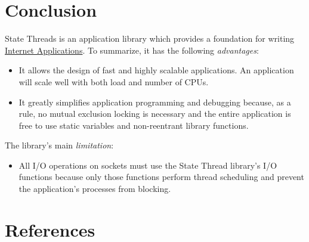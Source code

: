 \documentclass[a4paper,12pt,notitlepage,twoside,openright]{article}
\begin{document}
\hypertarget{conclusion}{%
\section{Conclusion}\label{conclusion}}

State Threads is an application library which provides a foundation for
writing \protect\hyperlink{IA}{Internet Applications}. To summarize, it
has the following \emph{advantages}:

\begin{itemize}

\item
  It allows the design of fast and highly scalable applications. An
  application will scale well with both load and number of CPUs.
\item
  It greatly simplifies application programming and debugging because,
  as a rule, no mutual exclusion locking is necessary and the entire
  application is free to use static variables and non-reentrant library
  functions.
\end{itemize}

The library's main \emph{limitation}:

\begin{itemize}

\item
  All I/O operations on sockets must use the State Thread library's I/O
  functions because only those functions perform thread scheduling and
  prevent the application's processes from blocking.
\end{itemize}

\hypertarget{references}{%
\section{References}\label{references}}
\end{document}
